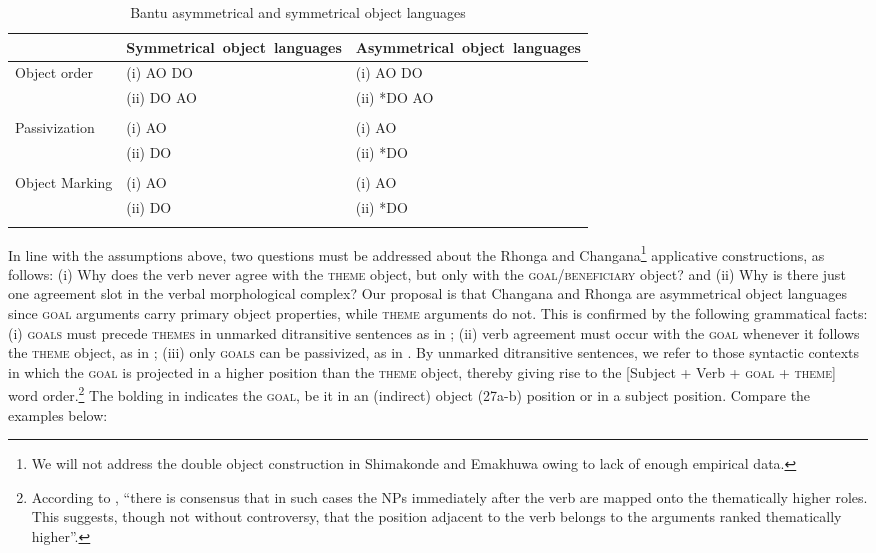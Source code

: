 \documentclass[output=paper]{langsci/langscibook}
\begin{document}
\begin{table}
\caption{Bantu asymmetrical and symmetrical object languages}
\label{tab:nguna:3}


\begin{tabularx}{\textwidth}{p{1.8cm}XX}
\lsptoprule
& \mbox{Symmetrical object languages}&\mbox{Asymmetrical object languages}\\
\midrule
 Object order& {(i) AO DO} & (i) AO DO\\
	    & (ii) DO AO  & (ii) *DO AO\\
\\
 
 Passivization& (i) AO & (i) AO\\
	      & (ii) DO&  (ii) *DO\\
 \\
 
 Object Marking& (i) AO &  (i) AO\\
	      & (ii) DO&  (ii) *DO\\
\lspbottomrule
\end{tabularx}
\end{table}

In line with the assumptions above, {two questions must be addressed about the Rhonga and Changana}\footnote{ {We will not address the double object construction in Shimakonde and Emakhuwa owing to lack of enough empirical data. }} {applicative constructions, as follows: (i) Why does the verb never agree with the }{\textsc{theme}} {object, but only with the }{\textsc{goal}}{/}{\textsc{beneficiary}} {object? and (ii) Why is there just one agreement slot in the verbal morphological complex? }Our proposal is that Changana and Rhonga are asymmetrical object languages since \textsc{goal} arguments carry primary object properties, while \textsc{theme} arguments do not. This is confirmed by the following grammatical facts: (i) \textsc{goals} must precede \textsc{themes} in unmarked ditransitive sentences as in ; (ii) verb agreement must occur with the \textsc{goal} whenever it follows the \textsc{theme} object, as in ; (iii) only \textsc{goals} can be passivized, as in . By unmarked ditransitive sentences, we refer to those syntactic contexts in which the \textsc{goal} is projected in a higher position than the \textsc{theme} object, thereby giving rise to the [Subject + Verb + \textsc{goal} + \textsc{theme}] word order.\footnote{ {According to \citet[111]{Chimbutane2002}, “there is consensus that in such cases the NPs immediately after the verb are mapped onto the thematically higher roles. This suggests, though not without controversy, that the position adjacent to the verb belongs to the arguments ranked thematically higher”.}} The bolding in  indicates the \textsc{goal}, be it in an (indirect) object (27a-b) position or in a subject  position. Compare the examples below:
\end{document}
